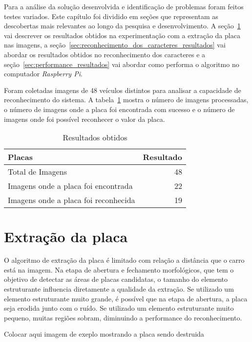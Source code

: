Para a análise da solução desenvolvida e identificação de problemas foram feitos testes variados. Este capítulo foi dividido em seções que representam as descobertas mais relevantes ao longo da pesquisa e desenvolvimento. A seção~\ref{sec:extracao_da_placa_resultados} vai descrever os resultados obtidos na experimentação com a extração da placa nas imagens, a seção~\ref{sec:reconhecimento_dos_caracteres_resultados} vai abordar os resultados obtidos no reconhecimento dos caracteres e a seção~\ref{sec:performance_resultados} vai abordar como performa o algoritmo no computador \emph{Raspberry Pi}.

Foram coletadas imagens de 48 veículos distintos para analisar a capacidade de reconhecimento do sistema. A tabela~\ref{tab:resultados} mostra o número de imagens processadas, o número de imagens onde a placa foi encontrada com sucesso e o número de imagens onde foi possível reconhecer o valor da placa.

\begin{table}[]
\centering
\caption{Resultados obtidos}
\label{tab:resultados}
\begin{tabular}{@{}lr@{}}
\toprule
Placas                               & \multicolumn{1}{l}{Resultado} \\ \midrule
Total de Imagens                     & 48                           \\
Imagens onde a placa foi encontrada  & 22                            \\
Imagens onde a placa foi reconhecida & 19                            
\end{tabular}
\end{table}

\section{Extração da placa}
\label{sec:extracao_da_placa_resultados}


O algoritmo de extração da placa é limitado com relação a distância que o carro está na imagem. Na etapa de abertura e fechamento morfológicos, que tem o objetivo de detectar as áreas de placas candidatas, o tamanho do elemento estruturante influencia diretamente a qualidade da extração. Se utilizado um elemento estruturante muito grande, é possível que na etapa de abertura, a placa seja erodida junto com o ruído. Se utilizado um elemento estruturante muito pequeno, muitas regiões sobram, diminuindo a performance do reconhecimento. 

Colocar aqui imagem de exeplo mostrando a placa sendo destruida

